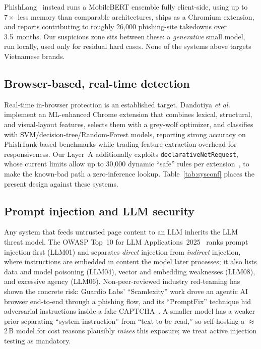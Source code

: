 \documentclass[conference]{IEEEtran}
\begin{document}
PhishLang~\cite{roy2024phishlang} instead runs a MobileBERT ensemble fully
client-side, using up to $7\times$ less memory than comparable architectures,
ships as a Chromium extension, and reports contributing to roughly 26{,}000
phishing-site takedowns over 3.5~months. Our suspicious zone sits between these:
a \emph{generative} small model, run locally, used only for residual hard cases.
None of the systems above targets Vietnamese brands.

\subsection{Browser-based, real-time detection}
Real-time in-browser protection is an established target. Dandotiya \emph{et
al.}~\cite{scirep2026extension} implement an ML-enhanced Chrome extension that
combines lexical, structural, and visual-layout features, selects them with a
grey-wolf optimizer, and classifies with SVM/decision-tree/Random-Forest models,
reporting strong accuracy on PhishTank-based benchmarks while trading
feature-extraction overhead for responsiveness. Our Layer~A additionally exploits
\texttt{declarativeNetRequest}, whose current limits allow up to 30{,}000 dynamic
``safe'' rules per extension~\cite{chrome_dnr}, to make the known-bad path a
zero-inference lookup. Table~\ref{tab:sysconf} places the present design against
these systems.

\subsection{Prompt injection and LLM security}
Any system that feeds untrusted page content to an LLM inherits the LLM threat
model. The OWASP Top~10 for LLM Applications~2025~\cite{owasp2025llmtop10} ranks
prompt injection first (LLM01) and separates \emph{direct} injection from
\emph{indirect} injection, where instructions are embedded in content the model
later processes; it also lists data and model poisoning (LLM04), vector and
embedding weaknesses (LLM08), and excessive agency (LLM06). Non-peer-reviewed
industry red-teaming has shown the concrete risk: Guardio Labs' ``Scamlexity''
work drove an agentic AI browser end-to-end through a phishing flow, and its
``PromptFix'' technique hid adversarial instructions inside a fake
CAPTCHA~\cite{guardio2025scamlexity}. A smaller model has a weaker prior
separating ``system instruction'' from ``text to be read,'' so self-hosting a
$\approx$2\,B model for cost reasons plausibly \emph{raises} this exposure; we
treat active injection testing as mandatory.
\end{document}

